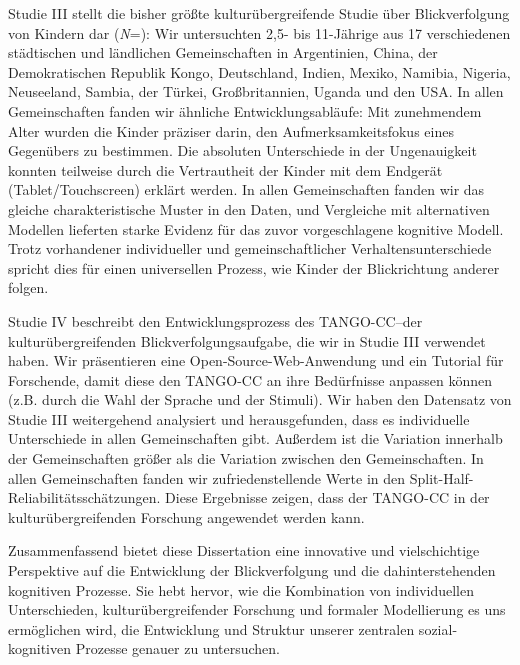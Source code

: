 \documentclass[
]{scrbook}
\begin{document}
Studie III stellt die bisher größte kulturübergreifende Studie über Blickverfolgung von Kindern dar (\emph{N}\thinspace =): Wir untersuchten 2,5- bis 11-Jährige aus 17 verschiedenen städtischen und ländlichen Gemeinschaften in Argentinien, China, der Demokratischen Republik Kongo, Deutschland, Indien, Mexiko, Namibia, Nigeria, Neuseeland, Sambia, der Türkei, Großbritannien, Uganda und den USA. In allen Gemeinschaften fanden wir ähnliche Entwicklungsabläufe: Mit zunehmendem Alter wurden die Kinder präziser darin, den Aufmerksamkeitsfokus eines Gegenübers zu bestimmen. Die absoluten Unterschiede in der Ungenauigkeit konnten teilweise durch die Vertrautheit der Kinder mit dem Endgerät (Tablet/Touchscreen) erklärt werden. In allen Gemeinschaften fanden wir das gleiche charakteristische Muster in den Daten, und Vergleiche mit alternativen Modellen lieferten starke Evidenz für das zuvor vorgeschlagene kognitive Modell. Trotz vorhandener individueller und gemeinschaftlicher Verhaltensunterschiede spricht dies für einen universellen Prozess, wie Kinder der Blickrichtung anderer folgen.

Studie IV beschreibt den Entwicklungsprozess des TANGO-CC\thinspace --\thinspace der kulturübergreifenden Blickverfolgungsaufgabe, die wir in Studie III verwendet haben. Wir präsentieren eine Open-Source-Web-Anwendung und ein Tutorial für Forschende, damit diese den TANGO-CC an ihre Bedürfnisse anpassen können (z.B. durch die Wahl der Sprache und der Stimuli). Wir haben den Datensatz von Studie III weitergehend analysiert und herausgefunden, dass es individuelle Unterschiede in allen Gemeinschaften gibt. Außerdem ist die Variation innerhalb der Gemeinschaften größer als die Variation zwischen den Gemeinschaften. In allen Gemeinschaften fanden wir zufriedenstellende Werte in den Split-Half-Reliabilitätsschätzungen. Diese Ergebnisse zeigen, dass der TANGO-CC in der kulturübergreifenden Forschung angewendet werden kann.

Zusammenfassend bietet diese Dissertation eine innovative und vielschichtige Perspektive auf die Entwicklung der Blickverfolgung und die dahinterstehenden kognitiven Prozesse. Sie hebt hervor, wie die Kombination von individuellen Unterschieden, kulturübergreifender Forschung und formaler Modellierung es uns ermöglichen wird, die Entwicklung und Struktur unserer zentralen sozial-kognitiven Prozesse genauer zu untersuchen.

\renewcommand{\baselinestretch}{1.2}\normalsize
\tableofcontents
\renewcommand{\baselinestretch}{1.5}\normalsize
\end{document}
